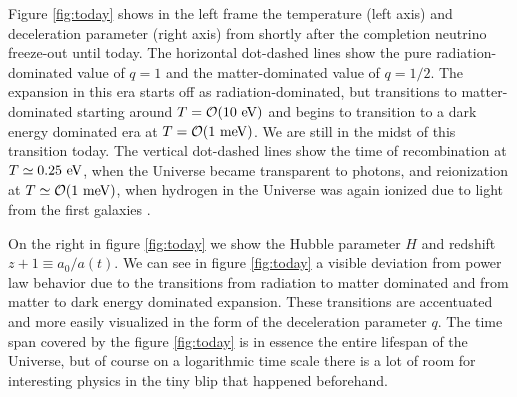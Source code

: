 Figure \ref{fig:today} shows in the left frame the temperature  (left axis) and deceleration parameter (right axis)  from shortly after the completion neutrino freeze-out until today.  The horizontal dot-dashed lines show  the pure radiation-dominated value of $q=1$ and the matter-dominated value of $q=1/2$. The expansion in this era starts off as radiation-dominated, but transitions to matter-dominated starting around $T=\mathcal{O}(10\text{ eV})$ and begins to transition to a dark energy dominated era at $T=\mathcal{O}(1\text{ meV})$. We are still in the midst of this transition today. The vertical dot-dashed lines show  the time of recombination at $T\simeq0.25\text{ eV}$, when the Universe became transparent to photons, and reionization at $T\simeq {\cal O}(1\meV)$, when hydrogen in the Universe was again ionized due to light from the first galaxies \cite{Zaroubi:2012in}. 

On the right in figure  \ref{fig:today}  we show the Hubble parameter $H$ and redshift $z+1\equiv a_0/a(t)$. We can see in figure \ref{fig:today} a visible deviation from power law behavior due to the transitions from radiation to matter dominated and from matter to dark energy dominated expansion.  These transitions are accentuated and more easily visualized in the form of the deceleration parameter $q$. The time span covered by the figure  \ref{fig:today} is in essence the entire lifespan of the Universe, but of course on a logarithmic time scale there is a lot of room for interesting physics in the tiny blip that happened beforehand.


